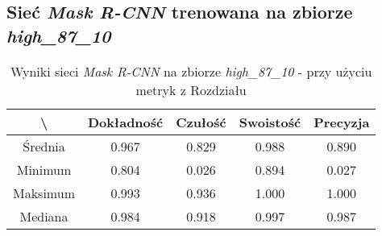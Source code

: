 \subsection{Sieć \textit{Mask R-CNN} trenowana na zbiorze \textit{high\_87\_10}}

\begin{table}[H]
	\centering
	\caption{Wyniki sieci \textit{Mask R-CNN} na zbiorze \textit{high\_87\_10} - przy użyciu metryk z Rozdziału }
	\vspace{6pt}
	{\footnotesize
		\begin{tabular}{|c|c|c|c|c|}
      \hline \textbackslash & Dokładność & Czułość & Swoistość & Precyzja \\
      \hline Średnia & 0.967 & 0.829 & 0.988 & 0.890 \\
      \hline Minimum & 0.804 & 0.026 & 0.894 & 0.027 \\
      \hline Maksimum & 0.993 & 0.936 & 1.000 & 1.000 \\
      \hline Mediana & 0.984 & 0.918 & 0.997 & 0.987 \\
      \hline
		\end{tabular}
	}
  \vspace{0pt}
  \label{Tab:high_original_calculated}
\end{table}

